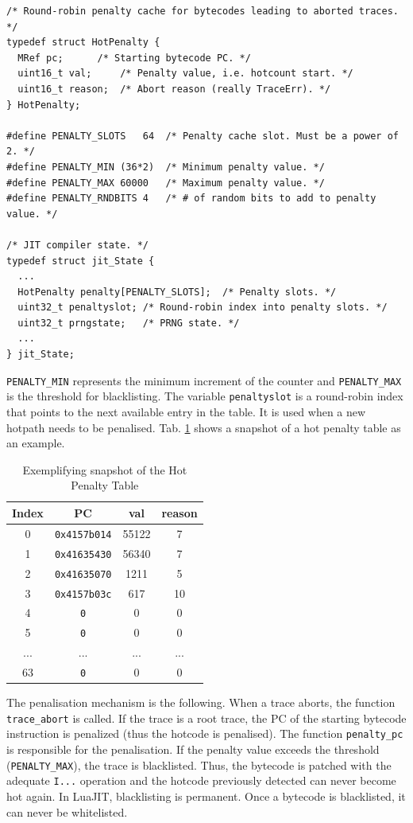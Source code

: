 \begin{lstlisting}[style=CStyle, caption=\texttt{lj\_traceerr.h}]
/* Round-robin penalty cache for bytecodes leading to aborted traces. */
typedef struct HotPenalty {
  MRef pc;		/* Starting bytecode PC. */
  uint16_t val;		/* Penalty value, i.e. hotcount start. */
  uint16_t reason;	/* Abort reason (really TraceErr). */
} HotPenalty;

#define PENALTY_SLOTS	64	/* Penalty cache slot. Must be a power of 2. */
#define PENALTY_MIN	(36*2)	/* Minimum penalty value. */
#define PENALTY_MAX	60000	/* Maximum penalty value. */
#define PENALTY_RNDBITS	4	/* # of random bits to add to penalty value. */

/* JIT compiler state. */
typedef struct jit_State {
  ...
  HotPenalty penalty[PENALTY_SLOTS];  /* Penalty slots. */
  uint32_t penaltyslot;	/* Round-robin index into penalty slots. */
  uint32_t prngstate;	/* PRNG state. */
  ...
} jit_State;
\end{lstlisting}
\texttt{PENALTY\_MIN} represents the minimum increment of the counter and \texttt{PENALTY\_MAX} is the threshold for blacklisting. The variable \texttt{penaltyslot} is a round-robin index that points to the next available entry in the table. It is used when a new hotpath needs to be penalised. Tab. \ref{tab:hot-penalty-table} shows a snapshot of a hot penalty table as an example.
\begin{table}[H]
    \centering
    \begin{tabular}{|c|c|c|c|}
        \hline
        Index & PC & val & reason \\
        \hline
        0 & \texttt{0x4157b014} & 55122 & 7\\
        1 & \texttt{0x41635430} & 56340 & 7\\ 
        2 & \texttt{0x41635070} & 1211 & 5\\ 
        3 & \texttt{0x4157b03c} & 
        617 & 10\\ 
        4 & \texttt{0} & 0 & 0 \\ 
        5 & \texttt{0} & 0 & 0\\ 
        ... & ... & ... & ...\\
        63 & \texttt{0} & 0 & 0\\
        \hline
    \end{tabular}
    \caption{Exemplifying snapshot of the Hot Penalty Table}
    \label{tab:hot-penalty-table}
\end{table}
\noindent
The penalisation mechanism is the following. When a trace aborts, the function \texttt{trace\_abort} is called. If the trace is a root trace, the PC of the starting bytecode instruction is penalized (thus the hotcode is penalised). The function \texttt{penalty\_pc} is responsible for the penalisation. If the penalty value exceeds the threshold (\texttt{PENALTY\_MAX}), the trace is blacklisted. Thus, the bytecode is patched with the adequate \texttt{I...} operation and the hotcode previously detected can never become hot again. In LuaJIT, blacklisting is permanent. Once a bytecode is blacklisted, it can never be whitelisted.

